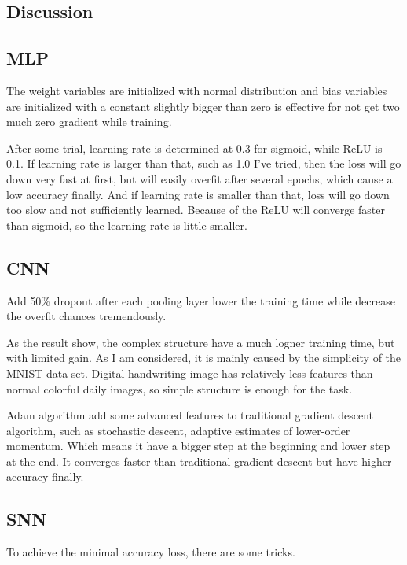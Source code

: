 \documentclass[10pt,twocolumn,letterpaper]{article}
\begin{document}
\begin{CJK}{UTF8}{gbsn}
\section{Discussion}

\subsection{MLP}

The weight variables are initialized with normal distribution and bias variables are initialized with a constant slightly bigger than zero is effective for not get two much zero gradient while training.

After some trial, learning rate is determined at 0.3 for sigmoid, while ReLU is 0.1. If learning rate is larger than that, such as 1.0 I've tried, then the loss will go down very fast at first, but will easily overfit after several epochs, which cause a low accuracy finally. And if learning rate is smaller than that, loss will go down too slow and not sufficiently learned. Because of the ReLU will converge faster than sigmoid, so the learning rate is little smaller.

\subsection{CNN}

Add 50\% dropout after each pooling layer lower the training time while decrease the overfit chances tremendously.

As the result show, the complex structure have a much logner training time, but with limited gain. As I am considered, it is mainly caused by the simplicity of the MNIST data set. Digital handwriting image has relatively less features than normal colorful daily images, so simple structure is enough for the task.

Adam algorithm add some advanced features to traditional gradient descent algorithm, such as stochastic descent, adaptive estimates of lower-order momentum. Which means it have a bigger step at the beginning and lower step at the end. It converges faster than traditional gradient descent but have higher accuracy finally.

\subsection{SNN}

To achieve the minimal accuracy loss, there are some tricks.


\end{CJK}
\end{document}
